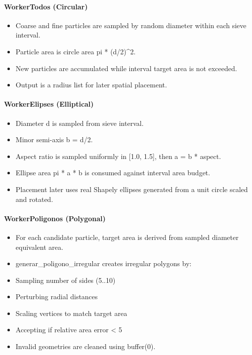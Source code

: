 ﻿\documentclass[11pt,a4paper]{article}
\begin{document}
\paragraph{WorkerTodos (Circular)}

\begin{itemize}
\item Coarse and fine particles are sampled by random diameter within each sieve interval.
\item Particle area is circle area pi * (d/2)\textasciicircum{}2.
\item New particles are accumulated while interval target area is not exceeded.
\item Output is a radius list for later spatial placement.
\end{itemize}

\paragraph{WorkerElipses (Elliptical)}

\begin{itemize}
\item Diameter d is sampled from sieve interval.
\item Minor semi-axis b = d/2.
\item Aspect ratio is sampled uniformly in [1.0, 1.5], then a = b * aspect.
\item Ellipse area pi * a * b is consumed against interval area budget.
\item Placement later uses real Shapely ellipses generated from a unit circle scaled and rotated.
\end{itemize}

\paragraph{WorkerPoligonos (Polygonal)}

\begin{itemize}
\item For each candidate particle, target area is derived from sampled diameter equivalent area.
\item generar\_poligono\_irregular creates irregular polygons by:
\item Sampling number of sides (5..10)
\item Perturbing radial distances
\item Scaling vertices to match target area
\item Accepting if relative area error < 5\\%
\item Invalid geometries are cleaned using buffer(0).
\end{itemize}
\end{document}
